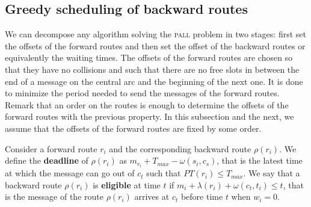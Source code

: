 \documentclass[10pt, conference, letterpaper]{IEEEtran}
\newcommand\pall{\textsc{pall}\xspace}
\begin{document}
     
%	 
% 
%    
   \subsection{Greedy scheduling of backward routes}
    
    We can decompose any algorithm solving the \pall problem in two stages: first set the offsets of the forward routes and then set the offset of the backward routes or equivalently the waiting times.  
    The offsets of the forward routes are chosen so that they have no collisions and such that there are no free slots in between the end of a message on the central arc and the beginning of the next one. It is done to minimize the period needed to send the messages of the forward routes. Remark that an order on the routes is enough to determine the offsets of the forward routes with the previous property. In this subsection and the next, we assume that the offsets of the forward routes are fixed by some order. 
    
    Consider a forward route $r_i$ and the corresponding backward route $\rho(r_i)$.
    We define the {\bf deadline} of $\rho(r_i)$ as $m_{r_i} + T_{max} - \omega(s_i,c_s)$, that is the latest time at which the message can go out of $c_t$ such that $PT(r_i) \leq T_{max}$.
    We say that a backward route $\rho(r_i)$ is {\bf eligible} at time $t$ if $m_{i} +  \lambda(r_i) + \omega(c_t,t_i) \leq t$, that is the message of the route $\rho(r_i)$ arrives at $c_t$ before time $t$ when $w_i = 0$.
    
\end{document}
